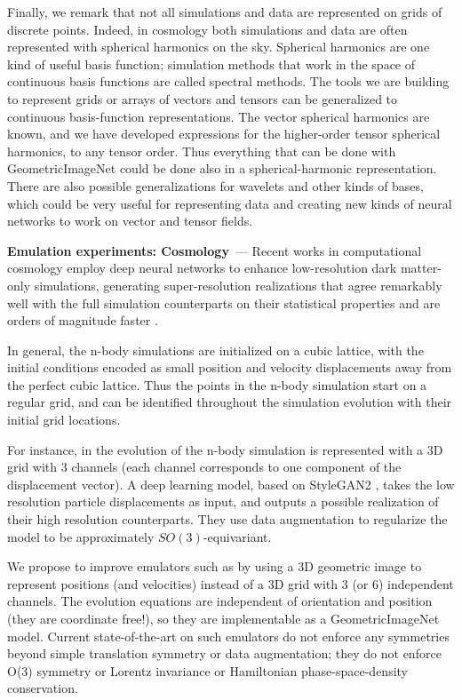 \documentclass[10pt]{article}
\renewcommand{\paragraph}[1]{\smallskip\par\noindent\textbf{#1}~---}
\begin{document}
Finally, we remark that not all simulations and data are represented on grids of discrete points.
Indeed, in cosmology both simulations and data are often represented with spherical harmonics on the sky.
Spherical harmonics are one kind of useful basis function; simulation methods that work in the space of continuous basis functions are called spectral methods.
The tools we are building to represent grids or arrays of vectors and tensors can be generalized to continuous basis-function representations.
The vector spherical harmonics are known, and we have developed expressions for the higher-order tensor spherical harmonics, to any tensor order.
Thus everything that can be done with GeometricImageNet could be done also in a spherical-harmonic representation.
There are also possible generalizations for wavelets and other kinds of bases, which could be very useful for representing data and creating new kinds of neural networks to work on vector and tensor fields.

\paragraph{Emulation experiments: Cosmology}
Recent works in computational cosmology employ deep neural networks to enhance low-resolution dark matter-only simulations, generating super-resolution realizations that agree remarkably well with the full simulation counterparts on their statistical properties and are orders of magnitude faster \cite{li2021ai, ni2021ai}. 

In general, the n-body simulations are initialized on a cubic lattice, with the initial conditions encoded as small position and velocity displacements away from the perfect cubic lattice. Thus the points in the n-body simulation start on a regular grid, and can be identified throughout the simulation evolution with their initial grid locations.

For instance, in \cite{li2021ai} the evolution of the n-body simulation is represented with a 3D grid with 3 channels (each
channel corresponds to one component of the displacement vector). A deep learning model, based on StyleGAN2 \cite{karras2020analyzing}, takes the low resolution particle displacements as input, and outputs a possible realization of their high resolution counterparts. They use data augmentation to regularize the model to be approximately $SO(3)$-equivariant. 

We propose to improve emulators such as \cite{li2021ai, ni2021ai} by using a 3D geometric image to represent positions (and velocities) instead of a 3D grid with 3 (or 6) independent channels. The evolution equations are independent of orientation and position (they are coordinate free!), so they are implementable as a GeometricImageNet model. Current state-of-the-art on such emulators do not enforce any symmetries beyond simple translation symmetry or data augmentation; they do not enforce O(3) symmetry or Lorentz invariance or Hamiltonian phase-space-density conservation.
\end{document}
